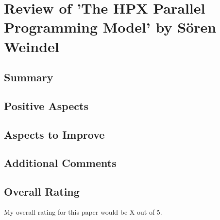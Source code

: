 \documentclass[ieeetran]{article}
\begin{document}
\section*{Review of 'The HPX Parallel Programming Model' by Sören Weindel} %
\label{sec:review_of_openMP_an_introduction_by_lukas_limmer}

\subsection*{Summary} %
\label{sub:summary}

\subsection*{Positive Aspects} %
\label{sub:positive_aspects}

\subsection*{Aspects to Improve} %
\label{sub:aspects_to_improve}

\subsection*{Additional Comments} %
\label{sub:additional_comments}

\subsection*{Overall Rating} %
\label{sub:overall_rating}
My overall rating for this paper would be X out of 5. 
\end{document}
